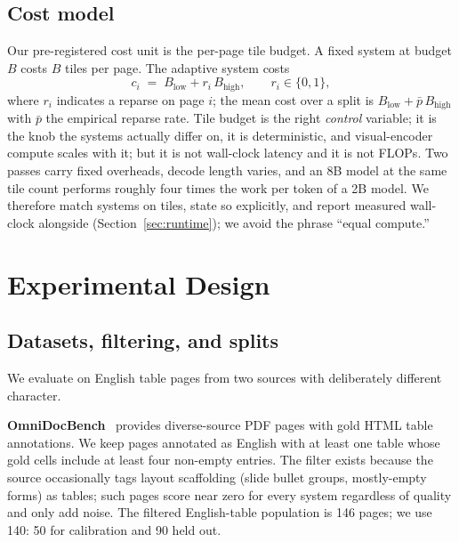 \documentclass[conference]{IEEEtran}
\begin{document}
\subsection{Cost model}
\label{sec:cost}

Our pre-registered cost unit is the per-page tile budget. A fixed system
at budget $B$ costs $B$ tiles per page. The adaptive system costs
\begin{equation}
  c_i \;=\; B_{\mathrm{low}} + r_i\, B_{\mathrm{high}},
  \qquad r_i \in \{0,1\},
  \label{eq:cost}
\end{equation}
where $r_i$ indicates a reparse on page $i$; the mean cost over a split
is $B_{\mathrm{low}} + \bar{p}\,B_{\mathrm{high}}$ with $\bar{p}$ the
empirical reparse rate. Tile budget is the right \emph{control} variable;
it is the knob the systems actually differ on, it is deterministic,
and visual-encoder compute scales with it; but it is not wall-clock
latency and it is not FLOPs. Two passes carry fixed overheads, decode
length varies, and an 8B model at the same tile count performs roughly
four times the work per token of a 2B model. We therefore match systems
on tiles, state so explicitly, and report measured wall-clock alongside
(Section~\ref{sec:runtime}); we avoid the phrase ``equal compute.''

\section{Experimental Design}
\label{sec:design}

\subsection{Datasets, filtering, and splits}
\label{sec:datasets}

We evaluate on English table pages from two sources with deliberately
different character.

\textbf{OmniDocBench}~\cite{ouyang2024omnidocbench} provides
diverse-source PDF pages with gold HTML table annotations. We keep pages
annotated as English with at least one table whose gold cells include at
least four non-empty entries. The filter exists because the source
occasionally tags layout scaffolding (slide bullet groups, mostly-empty
forms) as tables; such pages score near zero for every system regardless
of quality and only add noise. The filtered English-table population is
146 pages; we use 140: 50 for calibration and 90 held out.
\end{document}
